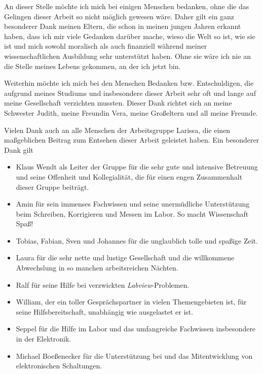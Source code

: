 An dieser Stelle möchte ich mich bei einigen Menschen bedanken, ohne die das
Gelingen dieser Arbeit so nicht möglich gewesen wäre. Daher gilt ein ganz
besonderer Dank meinen Eltern, die schon in meinen jungen Jahren erkannt haben,
dass ich mir viele Gedanken darüber mache, wieso die Welt so ist, wie sie ist
und mich sowohl moralisch als auch finanziell während meiner wissenschaftlichen
Ausbildung sehr unterstützt haben. Ohne sie wäre ich nie an die Stelle meines
Lebens gekommen, an der ich jetzt bin.\par
Weiterhin möchte ich mich bei den Menschen Bedanken bzw. Entschuldigen, die
aufgrund meines Studiums und insbesondere dieser Arbeit sehr oft und lange auf
meine Gesellschaft verzichten mussten. Dieser Dank richtet sich an meine
Schwester Judith, meine Freundin Vera, meine Großeltern und all meine
Freunde.\par
Vielen Dank auch an alle Menschen der Arbeitsgruppe Larissa, die einen
maßgeblichen Beitrag zum Entsehen dieser Arbeit geleistet haben. Ein besonderer
Dank gilt
\begin{itemize}
     \item Klaus Wendt als Leiter der Gruppe für die sehr gute und intensive
     Betreuung und seine Offenheit und Kollegialität, die für einen engen
     Zusammenhalt dieser Gruppe beiträgt.
     \item Amin für sein immenses Fachwissen und seine unermüdliche
     Unterstützung beim Schreiben, Korrigieren und Messen im Labor. So macht Wissenschaft Spaß!
     \item Tobias, Fabian, Sven und Johannes für die unglaublich tolle und
     spaßige Zeit.
     \item Laura für die sehr nette und lustige Gesellschaft und die willkommene
     Abwechslung in so manchen arbeitsreichen Nächten.
     \item Ralf für seine Hilfe bei verzwickten \textit{Labview}-Problemen.
     \item William, der ein toller Gesprächspartner in vielen Themengebieten
     ist, für seine Hilfsbereitschaft, unabhängig wie ausgelastet er ist.
     \item Seppel für die Hilfe im Labor und das umfangreiche Fachwissen
     insbesondere in der Elektronik.
     \item Michael Boeßenecker für die Unterstützung bei und das Mitentwicklung
     von elektronischen Schaltungen.
\end{itemize}
